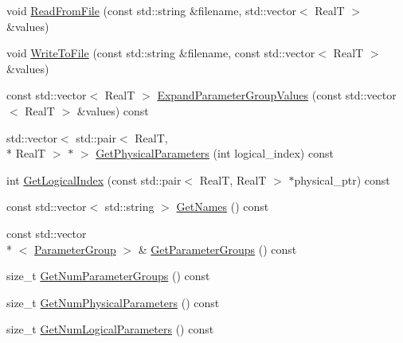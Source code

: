 \begin{DoxyCompactItemize}
\item 
void \hyperlink{class_parameter_manager_a252dfb04145a875f2ea6d0a66c021a97}{Read\+From\+File} (const std\+::string \&filename, std\+::vector$<$ Real\+T $>$ \&values)
\item 
void \hyperlink{class_parameter_manager_a836ef691153cf1c440da8cd3933395ad}{Write\+To\+File} (const std\+::string \&filename, const std\+::vector$<$ Real\+T $>$ \&values)
\item 
const std\+::vector$<$ Real\+T $>$ \hyperlink{class_parameter_manager_a47ddfcb769e8f6074b13cfa01fc03792}{Expand\+Parameter\+Group\+Values} (const std\+::vector$<$ Real\+T $>$ \&values) const 
\item 
std\+::vector$<$ std\+::pair$<$ Real\+T, \\*
Real\+T $>$ $\ast$ $>$ \hyperlink{class_parameter_manager_a7ff5d5a2b81a77db94c8d879a8cc620a}{Get\+Physical\+Parameters} (int logical\+\_\+index) const 
\item 
int \hyperlink{class_parameter_manager_a46dea3ed20a97d19ff4ddecf1b37d6cd}{Get\+Logical\+Index} (const std\+::pair$<$ Real\+T, Real\+T $>$ $\ast$physical\+\_\+ptr) const 
\item 
const std\+::vector$<$ std\+::string $>$ \hyperlink{class_parameter_manager_a3e53de0b8ec824feef3a6deabf4f419c}{Get\+Names} () const 
\item 
const std\+::vector\\*
$<$ \hyperlink{struct_parameter_group}{Parameter\+Group} $>$ \& \hyperlink{class_parameter_manager_a98e565008f243aa0bab93b801d206339}{Get\+Parameter\+Groups} () const 
\item 
size\+\_\+t \hyperlink{class_parameter_manager_af56ee5380a33948cc6909c874857cb21}{Get\+Num\+Parameter\+Groups} () const 
\item 
size\+\_\+t \hyperlink{class_parameter_manager_a5b12f8857c1c82fa4f8217fb8538d934}{Get\+Num\+Physical\+Parameters} () const 
\item 
size\+\_\+t \hyperlink{class_parameter_manager_ac9b5bef0d35ab50bc34c4eddb6d94c8c}{Get\+Num\+Logical\+Parameters} () const 
\end{DoxyCompactItemize}



